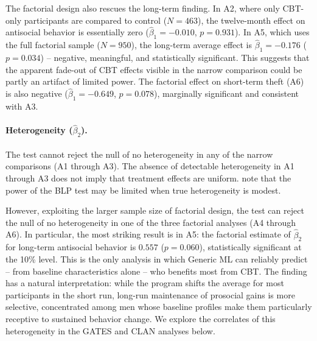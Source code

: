 \documentclass[11pt]{article}
\begin{document}
The factorial design also rescues the long-term finding. In A2, where only CBT-only participants are compared to control ($N = 463$), the twelve-month effect on antisocial behavior is essentially zero ($\hat\beta_1 = -0.010$, $p = 0.931$). In A5, which uses the full factorial sample ($N= 950$), the long-term average effect is $\hat\beta_1 = -0.176$ ($p = 0.034$) -- negative, meaningful, and statistically significant. This suggests that the apparent fade-out of CBT effects visible in the narrow comparison could be partly an artifact of limited power. The factorial effect on short-term theft (A6) is also negative ($\hat\beta_1 = -0.649$, $p = 0.078$), marginally significant and consistent with A3.

\paragraph{Heterogeneity ($\hat\beta_2$).}
The test cannot reject the null of no heterogeneity in any of the narrow comparisons (A1 through A3). The absence of detectable heterogeneity in A1 through A3 does not imply that treatment effects are uniform. \citet{chernozhukov2025} note that the power of the BLP test may be limited when true heterogeneity is modest. 

However, exploiting the larger sample size of factorial design, the test can reject the null of no heterogeneity in one of the three factorial analyses (A4 through A6). In particular,
the most striking result is in A5: the factorial estimate of $\hat\beta_2$ for long-term antisocial behavior is $0.557$ ($p = 0.060$), statistically significant at the 10\% level. This is the only analysis in which Generic ML can reliably predict -- from baseline characteristics alone -- who benefits most from CBT. The finding has a natural interpretation: while the program shifts the average for most participants in the short run, long-run maintenance of prosocial gains is more selective, concentrated among men whose baseline profiles make them particularly receptive to sustained behavior change. We explore the correlates of this heterogeneity in the GATES and CLAN analyses below.
\end{document}
